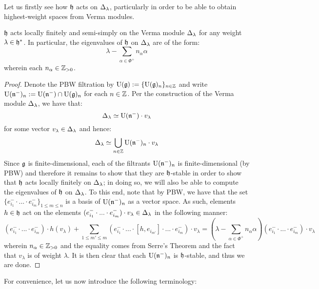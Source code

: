         Let us firstly see how $\mathfrak{h}$ acts on $\Delta_{\lambda}$, particularly in order to be able to obtain highest-weight spaces from Verma modules. 
        \begin{proposition} \label{prop: cartan_action_on_verma_modules}
            $\mathfrak{h}$ acts locally finitely and semi-simply on the Verma module $\Delta_{\lambda}$ for any weight $\lambda \in \mathfrak{h}^*$. In particular, the eigenvalues of $\mathfrak{h}$ on $\Delta_{\lambda}$ are of the form:
                $$\lambda - \sum_{\alpha \in \Phi^+} n_{\alpha} \alpha$$
            wherein each $n_{\alpha} \in \mathbb{Z}_{> 0}$.
        \end{proposition}
            \begin{proof}
                Denote the PBW filtration by $\mathrm{U}(\mathfrak{g}) := \{\mathrm{U}(\mathfrak{g})_n\}_{n \in \mathbb{Z}}$ and write $\mathrm{U}(\mathfrak{n}^-)_n := \mathrm{U}(\mathfrak{n}^-) \cap \mathrm{U}(\mathfrak{g})_n$ for each $n \in \mathbb{Z}$. Per the construction of the Verma module $\Delta_{\lambda}$, we have that:
                    $$\Delta_{\lambda} \simeq \mathrm{U}(\mathfrak{n}^-) \cdot v_{\lambda}$$
                for some vector $v_{\lambda} \in \Delta_{\lambda}$ and hence:
                    $$\Delta_{\lambda} \simeq \bigcup_{n \in \mathbb{Z}} \mathrm{U}(\mathfrak{n}^-)_n \cdot v_{\lambda}$$
                Since $\mathfrak{g}$ is finite-dimensional, each of the filtrants $\mathrm{U}(\mathfrak{n}^-)_n$ is finite-dimensional (by PBW) and therefore it remains to show that they are $\mathfrak{h}$-stable in order to show that $\mathfrak{h}$ acts locally finitely on $\Delta_{\lambda}$; in doing so, we will also be able to compute the eigenvalues of $\mathfrak{h}$ on $\Delta_{\lambda}$. To this end, note that by PBW, we have that the set $\{ e_{i_1}^- \cdot ... \cdot e_{i_m}^- \}_{1 \leq m \leq n}$ is a basis of $\mathrm{U}(\mathfrak{n}^-)_n$ as a vector space. As such, elements $h \in \mathfrak{h}$ act on the elements $(e_{i_1}^- \cdot ... \cdot e_{i_m}^-) \cdot v_{\lambda} \in \Delta_{\lambda}$ in the following manner:
                    $$(e_{i_1}^- \cdot ... \cdot e_{i_m}^-) \cdot h(v_{\lambda}) + \sum_{1 \leq m' \leq m} (e_{i_1}^- \cdot ... \cdot [h, e_{i_{m'}}] \cdot ... \cdot e_{i_m}^-) \cdot v_{\lambda} = (\lambda - \sum_{\alpha \in \Phi^+} n_{\alpha} \alpha) (e_{i_1}^- \cdot ... \cdot e_{i_m}^-) \cdot v_{\lambda}$$
                wherein $n_{\alpha} \in \mathbb{Z}_{> 0}$ and the equality comes from Serre's Theorem and the fact that $v_{\lambda}$ is of weight $\lambda$. It is then clear that each $\mathrm{U}(\mathfrak{n}^-)_n$ is $\mathfrak{h}$-stable, and thus we are done. 
            \end{proof}
        For convenience, let us now introduce the following terminology:
